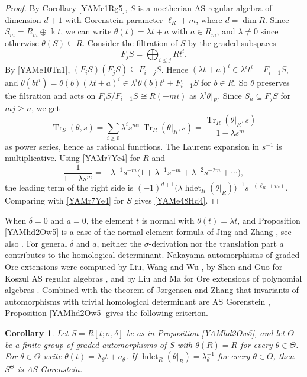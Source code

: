 \documentclass[reqno]{amsart}
\numberwithin{equation}{section}
\newtheorem{corollary}[equation]{Corollary}
\theoremstyle{definition}
\theoremstyle{remark}
\theoremstyle{plain}
\newcommand{\kk}{\Bbbk}
\DeclareMathOperator{\hdet}{hdet}
\DeclareMathOperator{\Tr}{Tr}
\begin{document}
\begin{proof}
By Corollary \ref{YAMc1Rg5}, $S$ is a noetherian AS regular algebra of dimension $d+1$ with Gorenstein parameter $\ell_R+m$, where $d=\dim R$. Since $S_m=R_m\oplus\kk t$, we can write $\theta(t)=\lambda t+a$ with $a\in R_m$, and $\lambda\neq0$ since otherwise $\theta(S)\subseteq R$. Consider the filtration of $S$ by the graded subspaces
\[
F_jS=\bigoplus_{i\le j}Rt^i.
\]
By \eqref{YAMe10Tn1}, $(F_iS)(F_jS)\subseteq F_{i+j}S$. Hence $(\lambda t+a)^i\in\lambda^it^i+F_{i-1}S$, and $\theta(bt^i)=\theta(b)(\lambda t+a)^i\in\lambda^i\theta(b)t^i+F_{i-1}S$ for $b\in R$. So $\theta$ preserves the filtration and acts on $F_iS/F_{i-1}S\cong R(-mi)$ as $\lambda^i\theta|_R$. Since $S_n\subseteq F_jS$ for $mj\ge n$, we get
\[
\Tr_S(\theta,s)=\sum_{i\ge0}\lambda^is^{mi}\,\Tr_R(\theta|_R,s)=\frac{\Tr_R(\theta|_R,s)}{1-\lambda s^m}
\]
as power series, hence as rational functions. The Laurent expansion in $s^{-1}$ is multiplicative. Using \eqref{YAMr7Ye4} for $R$ and
\[
\frac1{1-\lambda s^m}=-\lambda^{-1}s^{-m}\big(1+\lambda^{-1}s^{-m}+\lambda^{-2}s^{-2m}+\cdots\big),
\]
the leading term of the right side is $(-1)^{d+1}\big(\lambda\hdet_R(\theta|_R)\big)^{-1}s^{-(\ell_R+m)}$. Comparing with \eqref{YAMr7Ye4} for $S$ gives \eqref{YAMe48Hd4}.
\end{proof}

When $\delta=0$ and $a=0$, the element $t$ is normal with $\theta(t)=\lambda t$, and Proposition \ref{YAMhd2Ow5} is a case of the normal-element formula of Jing and Zhang \cite[Proposition 2.4]{JiZ}, see also \cite[Lemma 1.6]{KKZdu}. For general $\delta$ and $a$, neither the $\sigma$-derivation nor the translation part $a$ contributes to the homological determinant. Nakayama automorphisms of graded Ore extensions were computed by Liu, Wang and Wu \cite[Theorem 3.3]{LWW}, by Shen and Guo for Koszul AS regular algebras \cite{SG}, and by Liu and Ma for Ore extensions of polynomial algebras \cite{LM}. Combined with the theorem of J{\o}rgensen and Zhang that invariants of automorphisms with trivial homological determinant are AS Gorenstein \cite[Theorem 3.3]{JZ}, Proposition \ref{YAMhd2Ow5} gives the following criterion.

\begin{corollary}\label{YAMc3Ig7}
Let $S=R[t;\sigma,\delta]$ be as in Proposition \ref{YAMhd2Ow5}, and let $\Theta$ be a finite group of graded automorphisms of $S$ with $\theta(R)=R$ for every $\theta\in\Theta$. For $\theta\in\Theta$ write $\theta(t)=\lambda_\theta t+a_\theta$. If $\hdet_R(\theta|_R)=\lambda_\theta^{-1}$ for every $\theta\in\Theta$, then $S^\Theta$ is AS Gorenstein.
\end{corollary}
\end{document}
